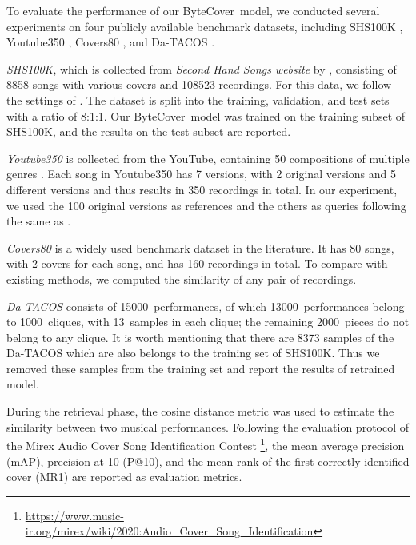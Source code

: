 \documentclass{article}
\newcommand{\ourname}{ByteCover}
\begin{document}
To evaluate the performance of our \ourname\ model, we conducted several experiments on four publicly available
benchmark datasets, including SHS100K \cite{xu2018key}, Youtube350 \cite{silva2015music}, Covers80 \cite{ellis2007identifying}, and Da-TACOS    \cite{yesiler2019datacos}. \par



\textit{SHS100K}, which is collected from \textit{Second Hand Songs website} by \cite{xu2018key}, consisting of 8858 songs with various covers and 108523 recordings. For this data, we follow the settings of \cite{yu2020learning}. The dataset is split into the training, validation, and test sets with a ratio of 8:1:1. Our \ourname\ model was trained on the training subset of SHS100K, and the results on the test subset are reported.\par

\textit{Youtube350} \cite{silva2015music} is collected from the YouTube, containing 50 compositions of multiple genres \cite{silva2015music}. Each song in Youtube350 has 7 versions, with 2 original versions and 5 different versions and thus results in 350 recordings in total. In our experiment, we used the 100 original versions as references and the others as queries following the same as \cite{silva2016simple,yu2019temporal,xu2018key}. \par

\textit{Covers80} \cite{ellis2007identifying} is a widely used benchmark dataset in the literature. It has 80 songs, with 2 covers for each song, and has 160 recordings in total. To compare with existing methods, we computed the similarity of any pair of recordings.

\textit{Da-TACOS} \cite{yesiler2019datacos} consists of 15000~performances, of which 13000~performances belong to 1000~cliques, with 13~samples in each clique; the remaining 2000~pieces do not belong to any clique.
It is worth mentioning that there are 8373 samples of the Da-TACOS which are also belongs to the training set of SHS100K. Thus we removed these samples from the training set and report the results of retrained model.




During the retrieval phase, the cosine distance metric was used to estimate the similarity between two musical performances.
Following the evaluation protocol of the Mirex Audio Cover Song Identification Contest \footnote{\url{https://www.music-ir.org/mirex/wiki/2020:Audio_Cover_Song_Identification}}, the mean average precision (mAP), precision at 10 (P@10), and the mean rank of the first correctly identified cover (MR1) are reported as evaluation metrics.
\end{document}
